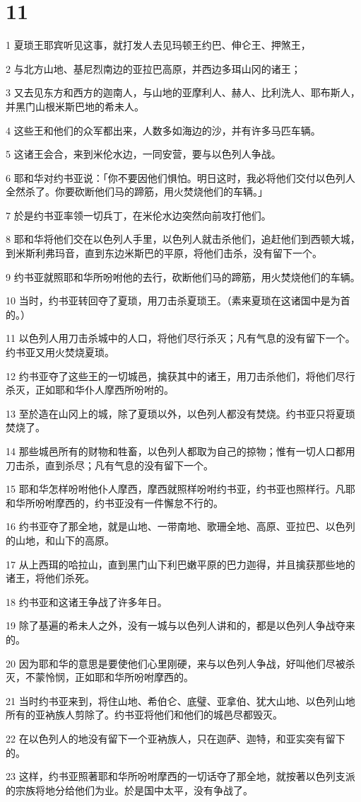\chapter{11}

\par 1 夏琐王耶宾听见这事，就打发人去见玛顿王约巴、伸仑王、押煞王，
\par 2 与北方山地、基尼烈南边的亚拉巴高原，并西边多珥山冈的诸王；
\par 3 又去见东方和西方的迦南人，与山地的亚摩利人、赫人、比利洗人、耶布斯人，并黑门山根米斯巴地的希未人。
\par 4 这些王和他们的众军都出来，人数多如海边的沙，并有许多马匹车辆。
\par 5 这诸王会合，来到米伦水边，一同安营，要与以色列人争战。
\par 6 耶和华对约书亚说：「你不要因他们惧怕。明日这时，我必将他们交付以色列人全然杀了。你要砍断他们马的蹄筋，用火焚烧他们的车辆。」
\par 7 於是约书亚率领一切兵丁，在米伦水边突然向前攻打他们。
\par 8 耶和华将他们交在以色列人手里，以色列人就击杀他们，追赶他们到西顿大城，到米斯利弗玛音，直到东边米斯巴的平原，将他们击杀，没有留下一个。
\par 9 约书亚就照耶和华所吩咐他的去行，砍断他们马的蹄筋，用火焚烧他们的车辆。
\par 10 当时，约书亚转回夺了夏琐，用刀击杀夏琐王。（素来夏琐在这诸国中是为首的。）
\par 11 以色列人用刀击杀城中的人口，将他们尽行杀灭；凡有气息的没有留下一个。约书亚又用火焚烧夏琐。
\par 12 约书亚夺了这些王的一切城邑，擒获其中的诸王，用刀击杀他们，将他们尽行杀灭，正如耶和华仆人摩西所吩咐的。
\par 13 至於造在山冈上的城，除了夏琐以外，以色列人都没有焚烧。约书亚只将夏琐焚烧了。
\par 14 那些城邑所有的财物和牲畜，以色列人都取为自己的掠物；惟有一切人口都用刀击杀，直到杀尽；凡有气息的没有留下一个。
\par 15 耶和华怎样吩咐他仆人摩西，摩西就照样吩咐约书亚，约书亚也照样行。凡耶和华所吩咐摩西的，约书亚没有一件懈怠不行的。
\par 16 约书亚夺了那全地，就是山地、一带南地、歌珊全地、高原、亚拉巴、以色列的山地，和山下的高原。
\par 17 从上西珥的哈拉山，直到黑门山下利巴嫩平原的巴力迦得，并且擒获那些地的诸王，将他们杀死。
\par 18 约书亚和这诸王争战了许多年日。
\par 19 除了基遍的希未人之外，没有一城与以色列人讲和的，都是以色列人争战夺来的。
\par 20 因为耶和华的意思是要使他们心里刚硬，来与以色列人争战，好叫他们尽被杀灭，不蒙怜悯，正如耶和华所吩咐摩西的。
\par 21 当时约书亚来到，将住山地、希伯仑、底璧、亚拿伯、犹大山地、以色列山地所有的亚衲族人剪除了。约书亚将他们和他们的城邑尽都毁灭。
\par 22 在以色列人的地没有留下一个亚衲族人，只在迦萨、迦特，和亚实突有留下的。
\par 23 这样，约书亚照著耶和华所吩咐摩西的一切话夺了那全地，就按著以色列支派的宗族将地分给他们为业。於是国中太平，没有争战了。

